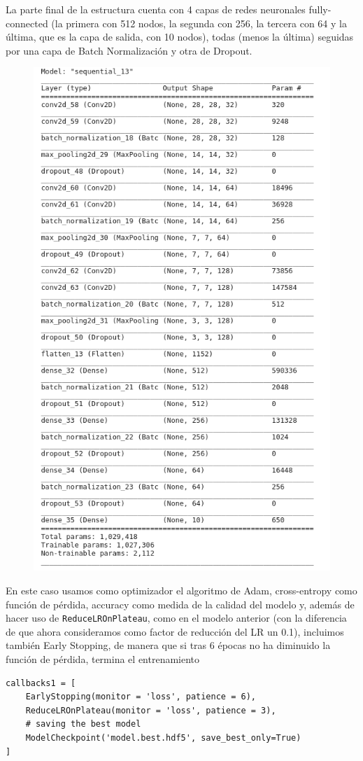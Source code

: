 \documentclass[a4paper,11pt]{article}
\begin{document}
La parte final de la estructura cuenta con 4 capas de redes neuronales fully-connected (la primera con 512 nodos, la segunda con 256, la tercera con 64 y la última, que es la capa de salida, con 10 nodos), todas (menos la última) seguidas por una capa de Batch Normalización y otra de Dropout.
\begin{figure}[H]
	\centering
	\includegraphics[width=0.8\linewidth]{img/cnn3}
	\caption{}
	\label{fig:cnn3}
\end{figure}

En este caso usamos como optimizador el algoritmo de Adam, cross-entropy como función de pérdida, accuracy como medida de la calidad del modelo y, además de hacer uso de \texttt{ReduceLROnPlateau}, como en el modelo anterior (con la diferencia de que ahora consideramos como factor de reducción del LR un 0.1), incluimos también Early Stopping, de manera que si tras 6 épocas no ha diminuido la función de pérdida, termina el entrenamiento
\begin{verbatim}
callbacks1 = [ 
	EarlyStopping(monitor = 'loss', patience = 6), 
	ReduceLROnPlateau(monitor = 'loss', patience = 3), 
	# saving the best model
	ModelCheckpoint('model.best.hdf5', save_best_only=True) 
]
\end{verbatim}
\end{document}
